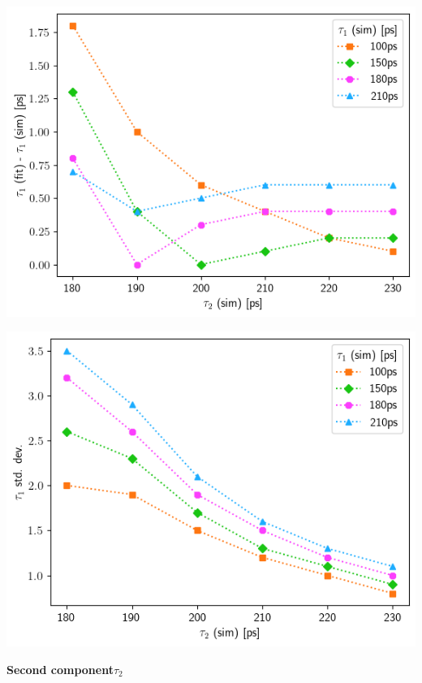 {\begin{minipage}{.47\linewidth}
    \includegraphics[width=\linewidth]{Batch 3/single Gaussian IRF/t1-diff 8020.png}
    \label{fig:compirf-t1-8020}
\end{minipage}
\hfill
\begin{minipage}{.47\linewidth}
     
    \includegraphics[width=\linewidth]{Batch 3/single Gaussian IRF/t1-err 8020.png}
    \label{fig:compirf-t1err-8020}
\end{minipage}

\vfill
\textbf{Second component$\tau_2$}

}
